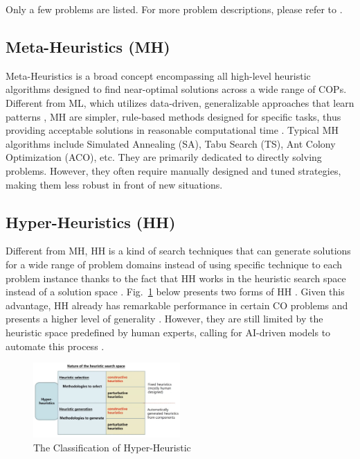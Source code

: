 \documentclass[a4paper]{article}
\begin{document}
\begin{enumerate}
\end{enumerate}

Only a few problems are listed. For more problem descriptions, please refer to \citet{Maryam}.

\subsection{Meta-Heuristics (MH)}
Meta-Heuristics is a broad concept encompassing all high-level heuristic algorithms designed to find near-optimal solutions across a wide range of COPs. Different from ML, which utilizes data-driven, generalizable approaches that learn patterns , MH are simpler, rule-based methods designed for specific tasks, thus providing acceptable solutions in reasonable computational time \citep{Hertz}. Typical MH algorithms include Simulated Annealing (SA), Tabu Search (TS), Ant Colony Optimization (ACO), etc. They are primarily dedicated to directly solving problems. However, they often require manually designed and tuned strategies, making them less robust in front of new situations.

\subsection{Hyper-Heuristics (HH)}
Different from MH, HH is a kind of search techniques that can generate solutions for a wide range of problem domains instead of using specific technique to each problem instance thanks to the fact that HH works in the heuristic search space instead of a solution space \citep{Ahmed}. Fig.~\ref{fig:hyper_heuristic} below presents two forms of HH \citep{Edmund}. Given this advantage, HH already has remarkable performance in certain CO problems and presents a higher level of generality \citep{Gabriel}. However, they are still limited by the heuristic space predefined by human experts, calling for AI-driven models to automate this process \citep{Ye}.
\begin{figure}[h]
\centering
\includegraphics[width=0.5\textwidth]{figures/Hyper Heuristic.png}
    \caption{\label{fig:hyper_heuristic}The Classification of Hyper-Heuristic}
\end{figure}
\end{document}

